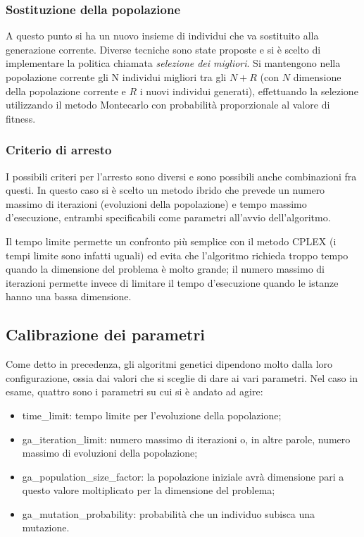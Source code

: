 \subsubsection{Sostituzione della popolazione}\label{subsubsec:sostituzione-popolazione}
A questo punto si ha un nuovo insieme di individui che va sostituito alla generazione corrente.
Diverse tecniche sono state proposte e si è scelto di implementare la politica chiamata \textit{selezione dei migliori}.
Si mantengono nella popolazione corrente gli N individui migliori tra gli $N + R$ (con $N$ dimensione della popolazione corrente
e $R$ i nuovi individui generati), effettuando la selezione utilizzando il metodo Montecarlo con probabilità
proporzionale al valore di fitness.
\subsubsection{Criterio di arresto}\label{subsubsec:criterio-arresto}
I possibili criteri per l'arresto sono diversi e sono possibili anche combinazioni fra questi.
In questo caso si è scelto un metodo ibrido che prevede un numero massimo di iterazioni (evoluzioni
della popolazione) e tempo massimo d'esecuzione, entrambi specificabili come parametri all'avvio dell'algoritmo.

Il tempo limite permette un confronto più semplice con il metodo CPLEX (i tempi limite sono infatti uguali)
ed evita che l'algoritmo richieda troppo tempo quando la dimensione del problema è molto grande;
il numero massimo di iterazioni permette invece di limitare il tempo d'esecuzione
quando le istanze hanno una bassa dimensione.
\subsection{Calibrazione dei parametri}\label{subsec:calibrazione-parametri}
Come detto in precedenza, gli algoritmi genetici dipendono molto dalla loro configurazione, ossia
dai valori che si sceglie di dare ai vari parametri.
Nel caso in esame, quattro sono i parametri su cui si è andato ad agire:
\begin{itemize}
	\item \textsf{time\_limit}: tempo limite per l'evoluzione della popolazione;
	\item \textsf{ga\_iteration\_limit}: numero massimo di iterazioni o, in altre parole, numero massimo di evoluzioni
	della popolazione;
	\item \textsf{ga\_population\_size\_factor}: la popolazione iniziale avrà dimensione pari a questo valore
	moltiplicato per la dimensione del problema;
	\item \textsf{ga\_mutation\_probability}: probabilità che un individuo subisca una mutazione.
\end{itemize}
%
